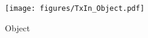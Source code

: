 \begin{figure}[H]
    \centering
    \texttt{[image: figures/TxIn\_Object.pdf]}
    \caption{\TxIn{} Object}
\end{figure}
